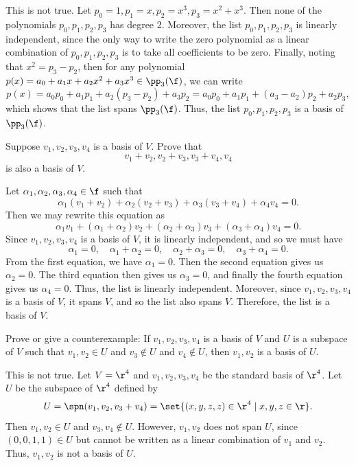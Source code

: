 \begin{sol}
    This is not true. Let $p_0 = 1, p_1 = x, p_2 = x^3, p_3 = x^2 + x^3$. Then none of the polynomials $p_0, p_1, p_2, p_3$ has degree 2. Moreover, the list $p_0, p_1, p_2, p_3$ is linearly independent, since the only way to write the zero polynomial as a linear combination of $p_0, p_1, p_2, p_3$ is to take all coefficients to be zero. Finally, noting that $x^2 = p_3 - p_2$, then for any polynomial $p(x) = a_0 + a_1 x + a_2 x^2 + a_3 x^3 \in \pp_3(\f)$, we can write
    \[p(x) = a_0 p_0 + a_1 p_1 + a_2 (p_3 - p_2) + a_3 p_2 = a_0 p_0 + a_1 p_1 + (a_3 - a_2)p_2 + a_2 p_3,\]
    which shows that the list spans $\pp_3(\f)$. Thus, the list $p_0, p_1, p_2, p_3$ is a basis of $\pp_3(\f)$.
\end{sol}

\begin{exercise}[2b7]
    Suppose $v_1, v_2, v_3, v_4$ is a basis of $V$. Prove that
    \[v_1 + v_2, v_2 + v_3, v_3 + v_4, v_4\]
    is also a basis of $V$.
\end{exercise}

\begin{sol}
    Let $\alpha_1, \alpha_2, \alpha_3, \alpha_4 \in \f$ such that
    \[\alpha_1(v_1 + v_2) + \alpha_2(v_2 + v_3) + \alpha_3(v_3 + v_4) + \alpha_4 v_4 = 0.\]
    Then we may rewrite this equation as
    \[\alpha_1 v_1 + (\alpha_1 + \alpha_2)v_2 + (\alpha_2 + \alpha_3)v_3 + (\alpha_3 + \alpha_4)v_4 = 0.\]
    Since $v_1, v_2, v_3, v_4$ is a basis of $V$, it is linearly independent, and so we must have
    \[\alpha_1 = 0, \quad \alpha_1 + \alpha_2 = 0, \quad \alpha_2 + \alpha_3 = 0, \quad \alpha_3 + \alpha_4 = 0.\]
    From the first equation, we have $\alpha_1 = 0$. Then the second equation gives us $\alpha_2 = 0$. The third equation then gives us $\alpha_3 = 0$, and finally the fourth equation gives us $\alpha_4 = 0$. Thus, the list is linearly independent. Moreover, since $v_1, v_2, v_3, v_4$ is a basis of $V$, it spans $V$, and so the list also spans $V$. Therefore, the list is a basis of $V$.
\end{sol}

\begin{exercise}[2b8]
    Prove or give a counterexample: If $v_1, v_2, v_3, v_4$ is a basis of $V$ and $U$ is a subspace of $V$ such that $v_1, v_2 \in U$ and $v_3 \notin U$ and $v_4 \notin U$, then $v_1, v_2$ is a basis of $U$.
\end{exercise}

\begin{sol}
    This is not true. Let $V = \r^4$ and $v_1, v_2, v_3, v_4$ be the standard basis of $\r^4$. Let $U$ be the subspace of $\r^4$ defined by
    \[U = \spn(v_1, v_2, v_3 + v_4) = \set{(x, y, z, z) \in \r^4 \mid x, y, z \in \r}.\]
    Then $v_1, v_2 \in U$ and $v_3, v_4 \notin U$. However, $v_1, v_2$ does not span $U$, since $(0, 0, 1, 1) \in U$ but cannot be written as a linear combination of $v_1$ and $v_2$. Thus, $v_1, v_2$ is not a basis of $U$.
\end{sol}

